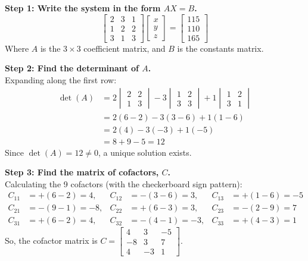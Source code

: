 \begin{solution}
\textbf{Step 1: Write the system in the form $AX = B$.} \\
\[
\begin{bmatrix} 2 & 3 & 1 \\ 1 & 2 & 2 \\ 3 & 1 & 3 \end{bmatrix} \begin{bmatrix} x \\ y \\ z \end{bmatrix} = \begin{bmatrix} 115 \\ 110 \\ 165 \end{bmatrix}
\]
Where $A$ is the $3 \times 3$ coefficient matrix, and $B$ is the constants matrix.

\medskip
\textbf{Step 2: Find the determinant of $A$.} \\
Expanding along the first row:
\begin{align*}
\det(A) &= 2 \begin{vmatrix} 2 & 2 \\ 1 & 3 \end{vmatrix} - 3 \begin{vmatrix} 1 & 2 \\ 3 & 3 \end{vmatrix} + 1 \begin{vmatrix} 1 & 2 \\ 3 & 1 \end{vmatrix} \\[6pt]
&= 2(6 - 2) - 3(3 - 6) + 1(1 - 6) \\
&= 2(4) - 3(-3) + 1(-5) \\
&= 8 + 9 - 5 = 12
\end{align*}
Since $\det(A) = 12 \neq 0$, a unique solution exists.

\medskip
\textbf{Step 3: Find the matrix of cofactors, $C$.} \\
Calculating the 9 cofactors (with the checkerboard sign pattern):
\begin{align*}
C_{11} &= +(6 - 2) = 4,   & C_{12} &= -(3 - 6) = 3,  & C_{13} &= +(1 - 6) = -5 \\
C_{21} &= -(9 - 1) = -8,  & C_{22} &= +(6 - 3) = 3,  & C_{23} &= -(2 - 9) = 7 \\
C_{31} &= +(6 - 2) = 4,   & C_{32} &= -(4 - 1) = -3, & C_{33} &= +(4 - 3) = 1
\end{align*}
So, the cofactor matrix is $C = \begin{bmatrix} 4 & 3 & -5 \\ -8 & 3 & 7 \\ 4 & -3 & 1 \end{bmatrix}$.


\end{solution}
